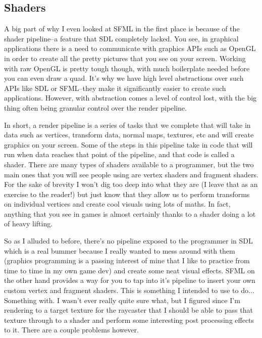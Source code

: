 \documentclass{article}
\begin{document}
\subsection{Shaders}
A big part of why I even looked at SFML in the first place is because of the
shader pipeline--a feature that SDL completely lacked. You see, in graphical
applications there is a need to communicate with graphics APIs such as OpenGL in
order to create all the pretty pictures that you see on your screen. Working
with raw OpenGL is pretty tough though, with much boilerplate needed before you
can even draw a quad. It's why we have high level abstractions over such APIs
like SDL or SFML--they make it significantly easier to create such applications.
However, with abstraction comes a level of control lost, with the big thing
often being granular control over the render pipeline.

In short, a render pipeline is a series of tasks that we complete that will take
in data such as vertices, transform data, normal maps, textures, etc and will
create graphics on your screen. Some of the steps in this pipeline take in code
that will run when data reaches that point of the pipeline, and that code is
called a shader. There are many types of shaders available to a programmer, but
the two main ones that you will see people using are vertex shaders and fragment
shaders. For the sake of brevity I won't dig too deep into what they are (I
leave that as an exercise to the reader!) but just know that they allow us to
perform transforms on individual vertices and create cool visuals using lots of
maths. In fact, anything that you see in games is almost certainly thanks to a
shader doing a lot of heavy lifting.

So as I alluded to before, there's no pipeline exposed to the programmer in SDL
which is a real bummer because I really wanted to mess around with them
(graphics programming is a passing interest of mine that I like to practice
from time to time in my own game dev) and create some neat visual effects. SFML
on the other hand provides a way for you to tap into it's pipeline to insert
your own custom vertex and fragment shaders. This is something I intended to
use to do... Something with. I wasn't ever really quite sure what, but I figured
since I'm rendering to a target texture for the raycaster that I should be able
to pass that texture through to a shader and perform some interesting post
processing effects to it. There are a couple problems however.
\end{document}
